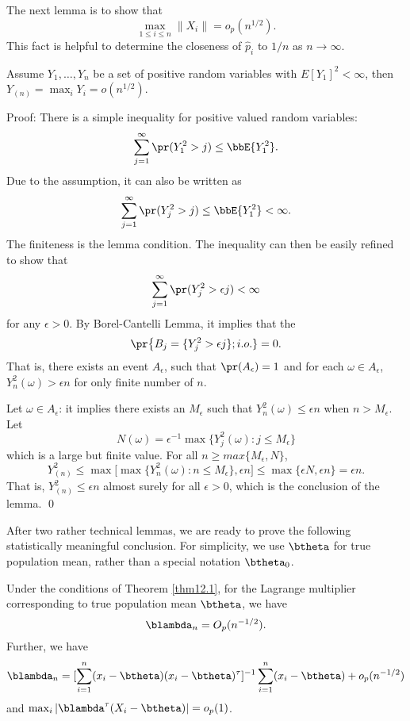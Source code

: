 The next lemma is to show that 
\[
\max_{1 \leq i \leq n}  \|X_i \| = o_p(n^{1/2}).
\]
This fact is helpful to determine the closeness of 
$\hat p_i$ to $1/n$ as $n \to \infty$.

\begin{lemma}
Assume $Y_1, \ldots, Y_n$ be a set of  \iid positive random variables with 
$E[Y_1]^2 < \infty$, then
$Y_{(n)} = \max_i Y_i = o(n^{1/2})$.
\end{lemma}

\noindent
{\sc Proof}: There is a simple inequality for positive valued random variables:
\[
\sum_{j=1}^\infty  \pr (Y_1^2  > j) \leq \bbE \{ Y_1^2\}.
\]
Due to the  \iid assumption, it can also be written as
\[
\sum_{j=1}^\infty  \pr (Y_j^2  > j) \leq \bbE \{ Y_1^2\} < \infty.
\]
The finiteness is the lemma condition.
The inequality can then be easily refined to show that
\[
\sum_{j=1}^\infty  \pr (Y_j^2  > \epsilon j)  < \infty
\]
for any $\epsilon > 0$. 
By Borel-Cantelli Lemma, it implies that 
the 
\[
\pr \big \{ B_j = \{ Y_j^2 >\epsilon j \}; i.o. \} = 0.
\]
That is, there exists an event  $A_\epsilon$, such that $\pr(A_\epsilon) = 1$ 
and for each $\omega \in A_\epsilon$, 
$Y_n^2 (\omega) >\epsilon n$ for only finite number of $n$. 

Let $\omega \in A_\epsilon$: it implies there exists an $M_\epsilon$ such that
$Y_n^2 (\omega) \leq \epsilon n$ when $n > M_\epsilon$.
Let
\[
N(\omega) = \epsilon^{-1} \max \{ Y_j^2(\omega): j \leq M_\epsilon \}
\]
which is a large but finite value.
For all $n \geq max \{M_\epsilon, N\}$, 
\[
Y_{(n)}^2 
\leq 
\max \big [ \max \{ Y_n^2(\omega): n \leq M_\epsilon\}, \epsilon n \big ]
\leq 
\max \{\epsilon N, \epsilon n \}
= \epsilon n.
\]
That is, $Y_{(n)}^2 \leq \epsilon n$ almost surely for all $\epsilon > 0$,
which is the conclusion of the lemma.
\qed

\vs
After two rather technical lemmas, we are ready to prove
the following statistically meaningful conclusion. For simplicity,
we use $\btheta$ for true population mean, rather than a special
notation $\btheta_0$.

\vs
\begin{lemma}
Under the conditions of Theorem \ref{thm12.1}, for the Lagrange multiplier
corresponding to true population mean $\btheta$, we have
\[
\blambda_n = O_p(n^{-1/2}).
\]
Further, we have
\[
\blambda_n =
[\sum_{i=1}^n (x_i-\btheta) (x_i-\btheta) ^\tau ]^{-1} \sum_{i=1}^n (x_i- \btheta)  
+ o_p(n^{-1/2})
\]
and
 $\max_i | \blambda^\tau ( X_i- \btheta)| = o_p(1)$.
\end{lemma}

